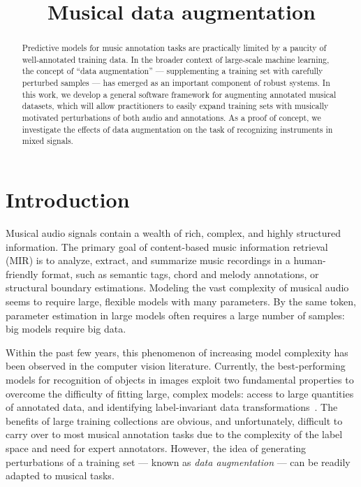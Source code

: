 \documentclass{article}
\title{Musical data augmentation}
\begin{document}
%
\maketitle
%
\begin{abstract}
Predictive models for music annotation tasks are practically limited by a paucity of
well-annotated training data.
In the broader context of large-scale machine learning, the concept of ``data
augmentation'' --- supplementing a training set with carefully perturbed samples ---
has emerged as an important component of robust systems.
In this work, we develop a general software framework for augmenting annotated
musical datasets, which will allow practitioners to easily expand training sets
with musically motivated perturbations of both audio and annotations.
As a proof of concept, we investigate the effects of data augmentation on
the task of recognizing instruments in mixed signals.
\end{abstract}
%
\section{Introduction}
\label{sec:introduction}


Musical audio signals contain a wealth of rich, complex, and highly structured
information.  The primary goal of content-based music information retrieval (MIR) is to
analyze, extract, and summarize music recordings in a human-friendly
format, such as semantic tags, chord and melody annotations, or structural boundary
estimations.  Modeling the vast complexity of musical audio seems to require large, 
flexible models with many parameters.
By the same token, parameter estimation in large models often requires
a large number of samples: big models require big data.

Within the past few years, this phenomenon of increasing model complexity has been 
observed in the computer vision literature.  Currently, the best-performing models for 
recognition of objects in images exploit two fundamental properties to overcome the 
difficulty of fitting large, complex models: access to large quantities of annotated data, 
and identifying label-invariant data transformations~\cite{krizhevsky2012imagenet}.
The benefits of large training collections are obvious, and unfortunately, difficult to
carry over to most musical annotation tasks due to the complexity of the label space and
need for expert annotators.  However, the idea of generating perturbations of a training
set --- known as \emph{data augmentation} --- can be readily adapted to musical tasks.
\end{document}
